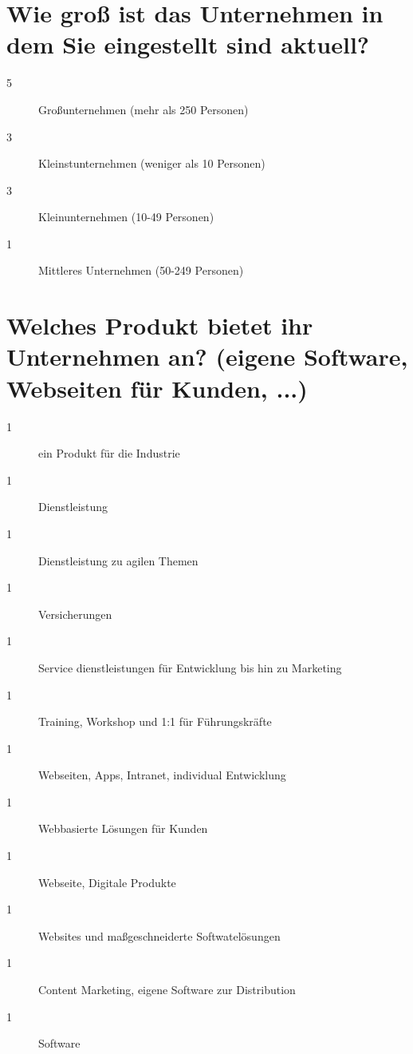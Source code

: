 \section*{Wie groß ist das Unternehmen in dem Sie eingestellt sind aktuell?}
\begin{description}
    \item[5 \responsecount] Großunternehmen (mehr als 250 Personen)
    \item[3 \responsecount] Kleinstunternehmen (weniger als 10 Personen)
    \item[3 \responsecount] Kleinunternehmen (10-49 Personen)
    \item[1 \responsecount] Mittleres Unternehmen (50-249 Personen)
\end{description}

\section*{Welches Produkt bietet ihr Unternehmen an? (eigene Software, Webseiten für Kunden, ...)}
\begin{description}
    \item[1 \responsecount] ein Produkt für die Industrie
    \item[1 \responsecount] Dienstleistung
    \item[1 \responsecount] Dienstleistung zu agilen Themen
    \item[1 \responsecount] Versicherungen
    \item[1 \responsecount] Service dienstleistungen für Entwicklung bis hin zu Marketing
    \item[1 \responsecount] Training, Workshop und 1:1 für Führungskräfte
    \item[1 \responsecount] Webseiten, Apps, Intranet, individual Entwicklung
    \item[1 \responsecount] Webbasierte Lösungen für Kunden
    \item[1 \responsecount] Webseite, Digitale Produkte
    \item[1 \responsecount] Websites und maßgeschneiderte Softwatelösungen
    \item[1 \responsecount] Content Marketing, eigene Software zur Distribution
    \item[1 \responsecount] Software
\end{description}

